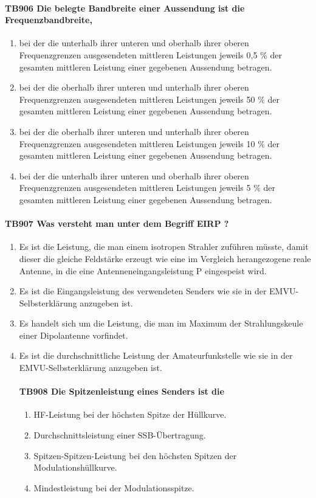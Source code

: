 \documentclass[8pt]{article}
\begin{document}
\begin{enumerate}
\paragraph*{TB906 Die belegte Bandbreite einer Aussendung ist die Frequenzbandbreite,}
\begin{enumerate}[nolistsep,label=\Alph*]
\item bei der die unterhalb ihrer unteren und oberhalb ihrer oberen Frequenzgrenzen ausgesendeten mittleren Leistungen jeweils 0,5 \% der gesamten mittleren Leistung einer gegebenen Aussendung betragen.
\item bei der die oberhalb ihrer unteren und unterhalb ihrer oberen Frequenzgrenzen ausgesendeten mittleren Leistungen jeweils 50 \% der gesamten mittleren Leistung einer gegebenen Aussendung betragen.
\item bei der die oberhalb ihrer unteren und unterhalb ihrer oberen Frequenzgrenzen ausgesendeten mittleren Leistungen jeweils 10 \% der gesamten mittleren Leistung einer gegebenen Aussendung betragen.
\item bei der die unterhalb ihrer unteren und oberhalb ihrer oberen Frequenzgrenzen ausgesendeten mittleren Leistungen jeweils 5 \% der gesamten mittleren Leistung einer gegebenen Aussendung betragen.
\end{enumerate}

\paragraph*{TB907 Was versteht man unter dem Begriff EIRP ?}
\begin{enumerate}[nolistsep,label=\Alph*]
\item Es ist die Leistung, die man einem isotropen Strahler zuführen müsste, damit dieser die gleiche Feldstärke erzeugt wie eine im Vergleich herangezogene reale Antenne, in die eine Antenneneingangsleistung P eingespeist wird.
\item Es ist die Eingangsleistung des verwendeten Senders wie sie in der EMVU-Selbsterklärung anzugeben ist. 
\item Es handelt sich um die Leistung, die man im Maximum der Strahlungskeule einer Dipolantenne vorfindet.
\item Es ist die durchschnittliche Leistung der Amateurfunkstelle wie sie in der EMVU-Selbsterklärung anzugeben ist.

\paragraph*{TB908 Die Spitzenleistung eines Senders ist die}
\begin{enumerate}[nolistsep,label=\Alph*]
\item HF-Leistung bei der höchsten Spitze der Hüllkurve. 
\item Durchschnittsleistung einer SSB-Übertragung.
\item Spitzen-Spitzen-Leistung bei den höchsten Spitzen der Modulationshüllkurve.
\item Mindestleistung bei der Modulationsspitze.
\end{enumerate}


\end{enumerate}
\end{enumerate}
\end{document}
